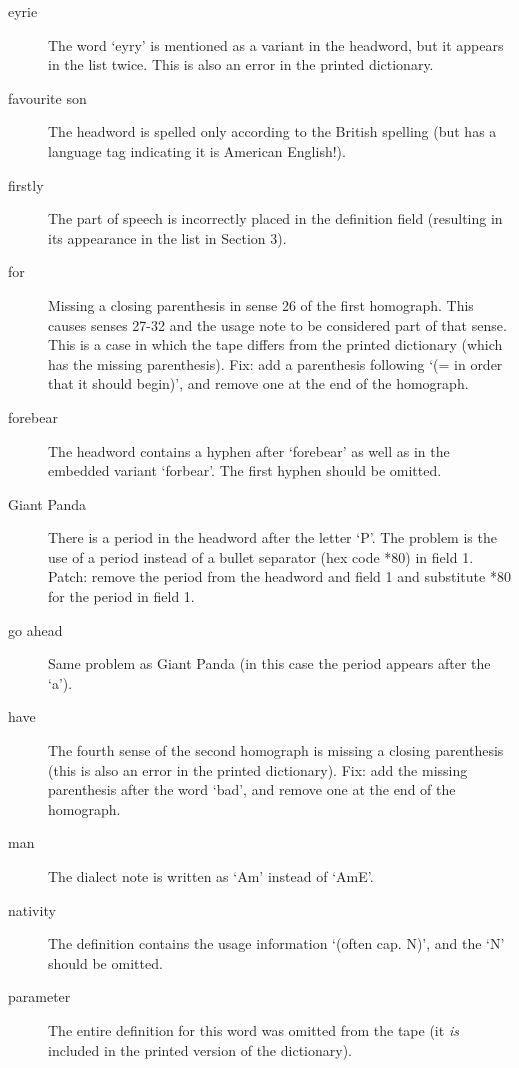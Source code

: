 \begin{description}
\item [eyrie]  The word `eyry' is mentioned as a variant in the headword, 
but it appears in the list twice.  This is also an error in the printed dictionary.


\item [favourite son]  The headword is spelled only according to the British spelling
(but has a language tag indicating it is American English!).


\item [firstly] The part of speech is incorrectly placed in the definition field
(resulting in its appearance in the list in Section 3).


\item [for] Missing a closing parenthesis in sense 26 of the first homograph.  This
causes senses 27-32 and the usage note to be considered part of that sense.  This
is a case in which the tape differs from the printed dictionary (which has the
missing parenthesis).  Fix: add a parenthesis following `(= in order that it should
begin)', and remove one at the end of the homograph.


\item [forebear]  The headword contains a hyphen after `forebear' as well as in the
embedded variant `forbear'.  The first hyphen should be omitted.


\item [Giant Panda] There is a period in the headword after the letter `P'.
  The problem is the use of a period instead of a bullet separator
(hex code *80) in field 1.   Patch: remove the period from the headword
and field 1 and substitute *80 for the period in field 1.


\item [go ahead]  Same problem as Giant Panda (in this case the period appears
after the `a').    


\item[have] The fourth sense of the second homograph is missing a closing
parenthesis (this is also an error in the printed dictionary).  Fix: add
the missing parenthesis after the word `bad', and remove one at the end
of the homograph.

\item [man] The dialect note is written as `Am' instead of `AmE'.


\item [nativity] The definition contains the usage information `(often cap. N)',
      and the `N' should be omitted.

\item [parameter] The entire definition for this word was omitted from the tape
(it {\em is} included in the printed version of the dictionary).


\end{description}
